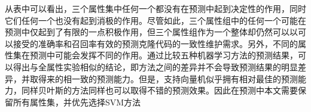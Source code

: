 从表中可以看出，三个属性集中任何一个都没有在预测中起到决定性的作用，同时它们任何一个也没有起到消极的作用。尽管如此，三个属性组中的任何一个可能在预测中仅起到了有限的一点积极作用，但三个属性组作为一个整体却仍然可以以可以接受的准确率和召回率有效的预测克隆代码的一致性维护需求。另外，不同的属性集在预测中可能会发挥不同的作用。通过比较五种机器学习方法的预测结果，可以得出与全属性实验相似的结论，即方法之间的差异并不会导致预测结果的明显差异，并取得来的相一致的预测能力。但是，支持向量机似乎拥有相对最佳的预测能力，同样贝叶斯的方法同样也可以取得不错的预测效果。因此在预测中本文需要保留所有属性集，并优先选择SVM方法


